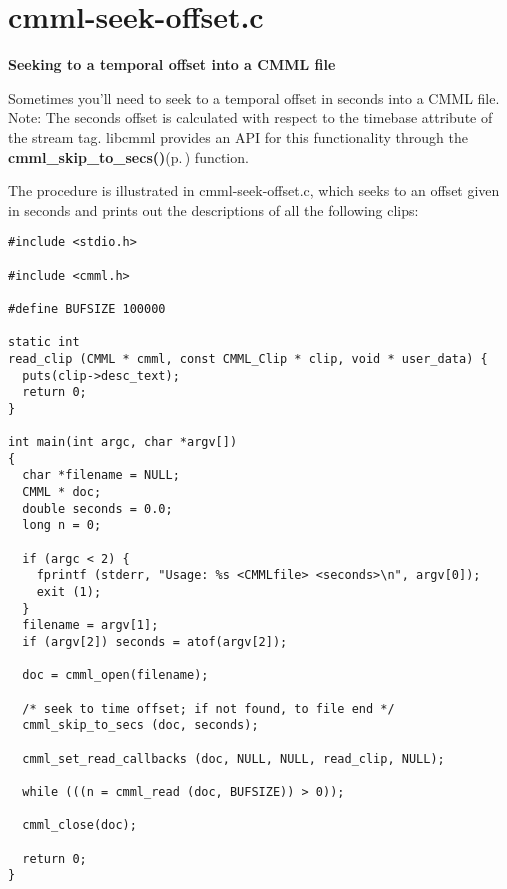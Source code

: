 \section{cmml-seek-offset.c}
{\bf Seeking to a temporal offset into a CMML file}

Sometimes you'll need to seek to a temporal offset in seconds into a CMML file. Note: The seconds offset is calculated with respect to the timebase attribute of the stream tag. libcmml provides an API for this functionality through the {\bf cmml\_\-skip\_\-to\_\-secs()}{\rm (p.\,\pageref{cmml_8h_a52})} function.

The procedure is illustrated in cmml-seek-offset.c, which seeks to an offset given in seconds and prints out the descriptions of all the following clips: 

\footnotesize\begin{verbatim}
#include <stdio.h>

#include <cmml.h>

#define BUFSIZE 100000

static int
read_clip (CMML * cmml, const CMML_Clip * clip, void * user_data) {
  puts(clip->desc_text);
  return 0;
}

int main(int argc, char *argv[])
{
  char *filename = NULL;
  CMML * doc;
  double seconds = 0.0;
  long n = 0;

  if (argc < 2) {
    fprintf (stderr, "Usage: %s <CMMLfile> <seconds>\n", argv[0]);
    exit (1);
  }
  filename = argv[1];
  if (argv[2]) seconds = atof(argv[2]);

  doc = cmml_open(filename);
 
  /* seek to time offset; if not found, to file end */
  cmml_skip_to_secs (doc, seconds);

  cmml_set_read_callbacks (doc, NULL, NULL, read_clip, NULL);
 
  while (((n = cmml_read (doc, BUFSIZE)) > 0));
   
  cmml_close(doc);

  return 0;
}
\end{verbatim}
\normalsize
 